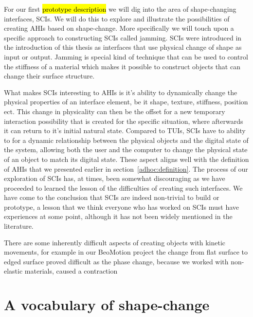 For our first \hl{prototype description} we will dig into the area of shape-changing interfaces, SCIs.
We will do this to explore and illustrate the possibilities of creating AHIs based on shape-change.
More specifically we will touch upon a specific approach to constructing SCIs called jamming.
SCIs were introduced in the introduction of this thesis as interfaces that use physical change of shape as input or output.
Jamming is special kind of technique that can be used to control the stiffness of a material which makes it possible to construct objects that can change their surface structure.

What makes SCIs interesting to AHIs is it's ability to dynamically change the physical properties of an interface element, be it shape, texture, stiffness, position ect.
This change in physicality can then be the offset for a new temporary interaction possibility that is created for the specific situation, where afterwards it can return to it's initial natural state.
Compared to TUIs, SCIs have to ability to for a dynamic relationship between the physical objects and the digital state of the system, allowing both the user and the computer to change the physical state of an object to match its digital state.
These aspect aligns well with the definition of AHIs that we presented earlier in section~\ref{adhoc:definition}.
\blank
The process of our exploration of SCIs has, at times, been somewhat discouraging as we have proceeded to learned the lesson of the difficulties of creating such interfaces.
We have come to the conclusion that SCIs are indeed non-trivial to build or prototype, a lesson that we think everyone who has worked on SCIs must have experiences at some point, although it has not been widely mentioned in the literature. 

There are some inherently difficult aspects of creating objects with kinetic movements, for example in our BeoMotion project the change from flat surface to edged surface proved difficult as the phase change, because we worked with non-elastic materials, caused a contraction


\section{A vocabulary of shape-change}
\label{ch:jamming:shape-change} 


